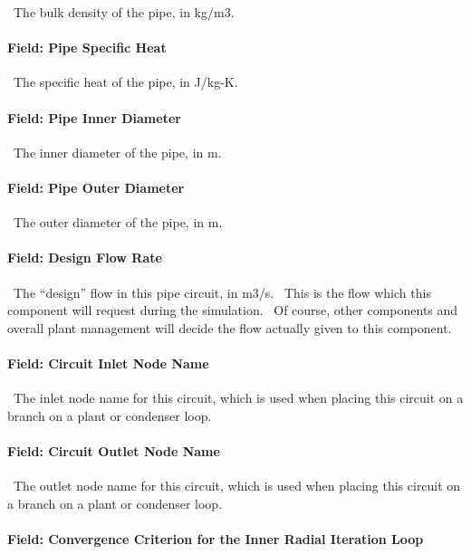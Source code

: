 ~The bulk density of the pipe, in kg/m3.

\paragraph{Field: Pipe Specific Heat}\label{field-pipe-specific-heat-000}

~The specific heat of the pipe, in J/kg-K.

\paragraph{Field: Pipe Inner Diameter}\label{field-pipe-inner-diameter}

~The inner diameter of the pipe, in m.

\paragraph{Field: Pipe Outer Diameter}\label{field-pipe-outer-diameter}

~The outer diameter of the pipe, in m.

\paragraph{Field: Design Flow Rate}\label{field-design-flow-rate-001}

~The ``design'' flow in this pipe circuit, in m3/s.~ This is the flow which this component will request during the simulation.~ Of course, other components and overall plant management will decide the flow actually given to this component.

\paragraph{Field: Circuit Inlet Node Name}\label{field-circuit-inlet-node-name}

~The inlet node name for this circuit, which is used when placing this circuit on a branch on a plant or condenser loop.

\paragraph{Field: Circuit Outlet Node Name}\label{field-circuit-outlet-node-name}

~The outlet node name for this circuit, which is used when placing this circuit on a branch on a plant or condenser loop.

\paragraph{Field: Convergence Criterion for the Inner Radial Iteration Loop}\label{field-convergence-criterion-for-the-inner-radial-iteration-loop}


